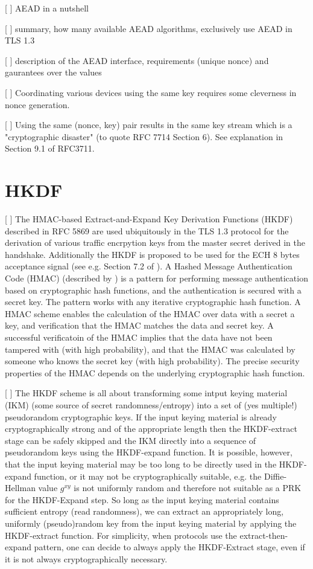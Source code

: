 [ ] AEAD in a nutshell

[ ] summary, how many available AEAD algorithms, exclusively use AEAD in TLS 1.3

[ ] description of the AEAD interface, requirements (unique nonce) and gaurantees over the values

[ ] Coordinating various devices using the same key requires some cleverness in nonce generation.

[ ] Using the same (nonce, key) pair results in the same key stream which is a "cryptographic disaster" (to quote RFC 7714 Section 6). See explanation in Section 9.1 of RFC3711.

\section{HKDF}

[ ] The HMAC-based Extract-and-Expand Key Derivation Functions (HKDF) described in RFC 5869 are used ubiquitously in the TLS 1.3 protocol for the derivation of various traffic encrpytion keys from the master secret derived in the handshake. Additionally the HKDF is proposed to be used for the ECH  8 bytes acceptance signal (see e.g. Section 7.2 of \cite{esni}). A Hashed Message Authentication Code (HMAC) (described by \cite{rfc2104}) is a pattern for performing message authentication based on cryptographic hash functions, and the authentication is secured with a secret key. The pattern works with any iterative cryptographic hash function. A HMAC scheme enables the calculation of the HMAC over data with a secret a key, and verification that the HMAC matches the data and secret key. A successful verificatoin of the HMAC implies that the data have not been tampered with (with high probability), and that the HMAC was calculated by someone who knows the secret key (with high probability). The precise security properties of the HMAC depends on the underlying cryptographic hash function.

[ ] The HKDF scheme is all about transforming some intput keying material (IKM) (some source of secret randomness/entropy) into a set of (yes multiple!) pseudorandom cryptographic keys. If the input keying material is already cryptographically strong and of the appropriate length then the HKDF-extract stage can be safely skipped and the IKM directly into a sequence of pseudorandom keys using the HKDF-expand function. It is possible, however, that the input keying material may be too long to be directly used in the HKDF-expand function, or it may not be cryptographically suitable, e.g. the Diffie-Hellman value $g^{xy}$ is not uniformly random and therefore not suitable as a PRK for the HKDF-Expand step. So long as the input keying material contains sufficient entropy (read randomness), we can extract an appropriately long, uniformly (pseudo)random key from the input keying material by applying the HKDF-extract function. For simplicity, when protocols use the extract-then-expand pattern, one can decide to always apply the HKDF-Extract stage, even if it is not always cryptographically necessary.

